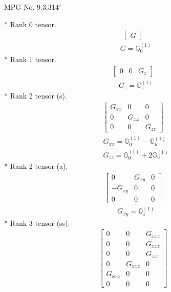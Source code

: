 \documentclass[fleqn,8pt,landscape]{jsarticle}
\begin{document}
\setcounter{MaxMatrixCols}{32}

\renewcommand{\tablename}{Table~}
\renewcommand{\figurename}{Figure~}
\begin{center}
\LARGE
MPG No. 9.3.31\quad$4'$
\end{center}
* Rank 0 tensor.
\begin{align*}
\begin{bmatrix} G \end{bmatrix}
\end{align*}
\begin{align*}
& G = \mathbb{G}_{0}^{(1)}
\end{align*}
* Rank 1 tensor.
\begin{align*}
\begin{bmatrix} 0 & 0 & G_{z} \end{bmatrix}
\end{align*}
\begin{align*}
& G_{z} = \mathbb{G}_{z}^{(1)}
\end{align*}
* Rank 2 tensor (s).
\begin{align*}
\begin{bmatrix} G_{xx} & 0 & 0 \\ 0 & G_{xx} & 0 \\ 0 & 0 & G_{zz} \end{bmatrix}
\end{align*}
\begin{align*}
& G_{xx} = \mathbb{G}_{0}^{(1)} - \mathbb{G}_{u}^{(1)} \\
& G_{zz} = \mathbb{G}_{0}^{(1)} + 2 \mathbb{G}_{u}^{(1)}
\end{align*}
* Rank 2 tensor (a).
\begin{align*}
\begin{bmatrix} 0 & G_{xy} & 0 \\ - G_{xy} & 0 & 0 \\ 0 & 0 & 0 \end{bmatrix}
\end{align*}
\begin{align*}
& G_{xy} = \mathbb{Q}_{z}^{(1)}
\end{align*}
* Rank 3 tensor (ss).
\begin{align*}
\begin{bmatrix} 0 & 0 & G_{xxz} \\ 0 & 0 & G_{xxz} \\ 0 & 0 & G_{zzz} \\ 0 & G_{xxz} & 0 \\ G_{xxz} & 0 & 0 \\ 0 & 0 & 0 \end{bmatrix}
\end{align*}
\end{document}
